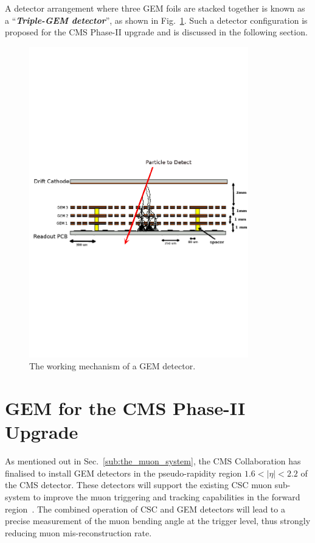 A detector arrangement where three GEM foils are stacked together is known as a ``\textit{\textbf{Triple-GEM detector}}'', as shown in Fig.~\ref{fig:gemgaps}. Such a detector configuration is proposed for the CMS Phase-II upgrade and is discussed in the following section.
\begin{figure}[!htbp]
    \begin{center}
        \includegraphics[width=0.85\textwidth]{figures/GEM/triple_gem.pdf}
        \caption{The working mechanism of a GEM detector.}
        \label{fig:gemgaps}
    \end{center}
\end{figure} 


\section{GEM for the CMS Phase-II Upgrade} %
\label{sec:gem_for_cms}
As mentioned out in Sec.~\ref{sub:the_muon_system},  the CMS Collaboration has finalised to install GEM detectors in the pseudo-rapidity region $1.6 < |\eta| < 2.2$ of the CMS detector.
These detectors will support the existing CSC muon sub-system to improve the muon triggering and tracking capabilities in the forward region~\cite{Colaleo:2021453}.
The combined operation of CSC and GEM detectors will lead to a precise measurement of the muon bending angle at the trigger level, thus strongly reducing muon mis-reconstruction rate.

